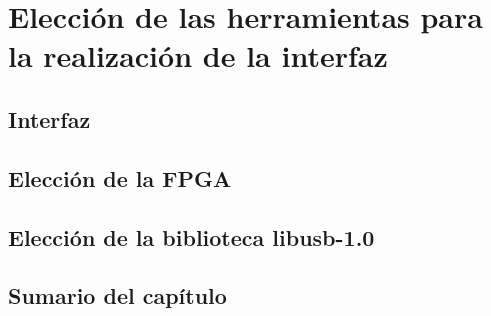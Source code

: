 \chapter{Elección de las herramientas para la realización de la interfaz}
	\label{cap:mats}
	
	\section{Interfaz}
			
	\section{Elección de la FPGA}
		
	\section{Elección de la biblioteca libusb-1.0}
		
	\section{Sumario del capítulo}
		
	
%		
%		
%		
		
